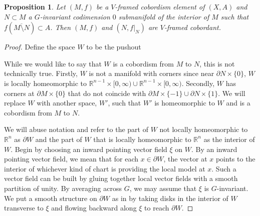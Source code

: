 \documentclass[11pt]{amsart}
\newcommand{\R}{\mathbb R}
\theoremstyle{plain}   %
\newtheorem{prop}[thm]{Proposition}
\theoremstyle{definition}
\theoremstyle{remark}
\numberwithin{equation}{section}
\begin{document}
\begin{prop}\label{prop:codim zero cobordism}
Let $(M,f)$ be a $V$-framed cobordism element of $(X,A)$ and $N\subset M$ a $G$-invariant codimension $0$ submanifold of the interior of $M$ such that $f(\overline{M\setminus N})\subset A$. Then $(M,f)$ and $(N,f|_N)$ are $V$-framed cobordant. 
\end{prop}

\begin{proof}
Define the space $W$ to be the pushout
\begin{figure}[H]
\center
{}
\end{figure}
While we would like to say that $W$ is a cobordism from $M$ to $N$, this is not technically true. Firstly, $W$ is not a manifold with corners since near $\partial N\times\{0\}$, $W$ is locally homeomorphic to $\R^{n-1}\times[0,\infty)\cup\R^{n-1}\times[0,\infty)$. Secondly, $W$ has corners at $\partial M\times\{0\}$ that do not coincide with $\partial M\times\{-1\}\cup \partial N\times\{1\}$. We will replace $W$ with another space, $W'$, such that $W'$ is homeomorphic to $W$ and is a cobordism from $M$ to $N$. 


We will abuse notation and refer to the part of $W$ not locally homeomorphic to $\R^n$ as $\partial W$ and the part of $W$ that is locally homeomorphic to $\R^n$ as the interior of $W$. Begin by choosing an inward pointing vector field $\xi$ on $W$. By an inward pointing vector field, we mean that for each $x\in \partial W$, the vector at $x$ points to the interior of whichever kind of chart is providing the local model at $x$. Such a vector field can be built by gluing together local vector fields with a smooth partition of unity. By averaging across $G$, we may assume that $\xi$ is $G$-invariant. We put a smooth structure on $\partial W$ as in \cite[Section 6]{manifold_approach} by taking disks in the interior of $W$ transverse to $\xi$ and flowing backward along $\xi$ to reach $\partial W$.


\end{proof}
\end{document}

